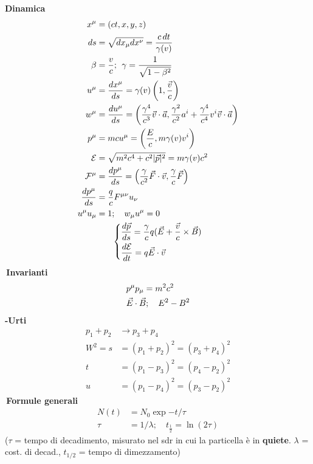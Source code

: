 \documentclass{article}
\begin{document}
\begin{minipage}[t]{.25\textwidth}
\raggedright
{\Large \textbf{Dinamica}}
\begin{align*}
    x^\mu &= (ct, x, y, z)\\
    ds &= \sqrt{dx_\mu dx^\nu} = \frac{c\,dt}{\gamma(v)}\\
    \beta &= \frac{v}{c}; \>\> \gamma = \frac{1}{\sqrt{1-\beta^2}}\\
    u^\mu &= \frac{dx^\mu}{ds} = \gamma(v)\left (1, \frac{\vec{v}}{c} \right )\\
    w^\mu &= \frac{du^\mu}{ds} = \left (\frac{\gamma^4}{c^3}\vec{v}\cdot \vec{a}, \frac{\gamma^2}{c^2}a^i+\frac{\gamma^4}{c^4}v^i\vec{v}\cdot \vec{a} \right )\\
    p^\mu &= mcu^\mu = \left (\frac{E}{c}, m\gamma(v)v^i \right )\\
    \mathcal{E} &= \sqrt{m^2c^4 + c^2|\vec{p}|^2} = m\gamma(v)c^2\\
    \mathcal{F}^\mu &= \frac{dp^\mu}{ds} = \left (\frac{\gamma}{c^2}\vec{F}\cdot \vec{v}, \frac{\gamma}{c}\vec{F} \right )\\
    \frac{dp^\mu}{ds} &= \frac{q}{c}F^{\mu\nu}u_\nu\\
    u^\mu u_\mu &= 1; \quad w_\mu u^\mu = 0\\
    \begin{dcases}
    \frac{d\vec{p}}{ds} = \frac{\gamma}{c}q(\vec{E}+\frac{\vec{v}}{c}\times\vec{B})\\
    \frac{d\mathcal{E}}{dt} = q\vec{E}\cdot \vec{v}
    \end{dcases}
    \span
\end{align*} 
\textbullet\,{\large \textbf{Invarianti}}
\begin{align*}
    p^\mu p_\mu &= m^2 c^2\\
    \vec{E}\cdot \vec{B}; \quad E^2-B^2\span
\end{align*}
{\center \textbf{-Urti}}
\begin{align*}
    p_1 + p_2 &\to p_3 + p_4\\
    W^2 = s &= (p_1+p_2)^2 = (p_3+p_4)^2\\
    t &= (p_1-p_3)^2 = (p_4-p_2)^2\\
    u &= (p_1-p_4)^2 = (p_3-p_2)^2
\end{align*}
\textbullet\,{\large \textbf{Formule generali}}\\ %
\begin{align*}
    N(t) &= N_0 \exp{-t/\tau}\\
    \tau &= 1/\lambda; \quad t_{\frac{1}{2}} = \ln(2\tau)
\end{align*}
($\tau$ = tempo di decadimento, misurato nel sdr in cui la particella è in \textbf{quiete}. $\lambda$ = cost. di decad., $t_{1/2}$ = tempo di dimezzamento)
\end{minipage}%
\end{document}
